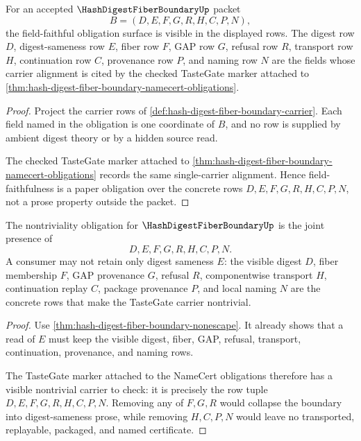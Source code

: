 \begin{theorem}
\label{thm:hash-digest-fiber-boundary-field-faithful-obligation}
For an accepted $\HashDigestFiberBoundaryUp$ packet
$$
B=(D,E,F,G,R,H,C,P,N),
$$
the field-faithful obligation surface is visible in the displayed rows. The digest row $D$, digest-sameness row $E$, fiber row $F$, GAP row $G$, refusal row $R$, transport row $H$, continuation row $C$, provenance row $P$, and naming row $N$ are the fields whose carrier alignment is cited by the checked TasteGate marker attached to \autoref{thm:hash-digest-fiber-boundary-namecert-obligations}.
\end{theorem}
\begin{proof}
Project the carrier rows of \autoref{def:hash-digest-fiber-boundary-carrier}. Each field named in the obligation is one coordinate of $B$, and no row is supplied by ambient digest theory or by a hidden source read.

The checked TasteGate marker attached to \autoref{thm:hash-digest-fiber-boundary-namecert-obligations} records the same single-carrier alignment. Hence field-faithfulness is a paper obligation over the concrete rows $D,E,F,G,R,H,C,P,N$, not a prose property outside the packet.
\end{proof}

\begin{theorem}
\label{thm:hash-digest-fiber-boundary-nontrivial-obligation}
The nontriviality obligation for $\HashDigestFiberBoundaryUp$ is the joint presence of
$$
D,E,F,G,R,H,C,P,N.
$$
A consumer may not retain only digest sameness $E$: the visible digest $D$, fiber membership $F$, GAP provenance $G$, refusal $R$, componentwise transport $H$, continuation replay $C$, package provenance $P$, and local naming $N$ are the concrete rows that make the TasteGate carrier nontrivial.
\end{theorem}
\begin{proof}
Use \autoref{thm:hash-digest-fiber-boundary-nonescape}. It already shows that a read of $E$ must keep the visible digest, fiber, GAP, refusal, transport, continuation, provenance, and naming rows.

The TasteGate marker attached to the NameCert obligations therefore has a visible nontrivial carrier to check: it is precisely the row tuple $D,E,F,G,R,H,C,P,N$. Removing any of $F,G,R$ would collapse the boundary into digest-sameness prose, while removing $H,C,P,N$ would leave no transported, replayable, packaged, and named certificate.
\end{proof}

